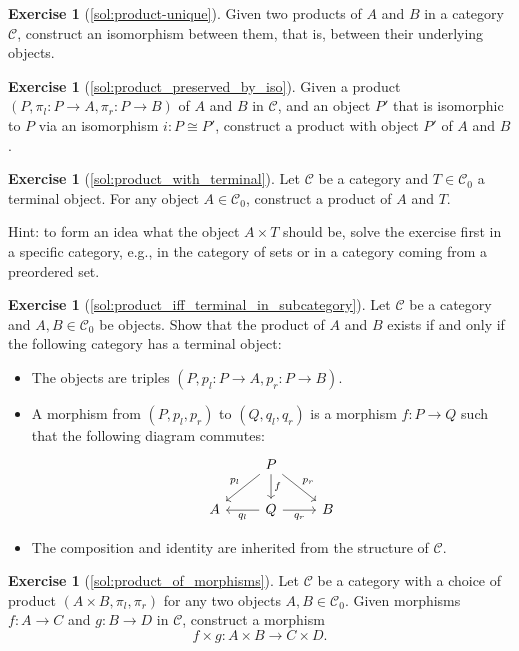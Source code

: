 \documentclass[a4paper,11pt, oneside,titlepage=false]{scrbook}
\theoremstyle{plain}
\theoremstyle{definition}
\newtheorem{exer}[thm]{Exercise}
\newcommand{\Cat}[1]{\mathcal{#1}}
\newcommand{\CC}{\Cat{C}}
\newcommand{\Ob}[1]{{#1}_0}
\newcommand{\projl}{\ensuremath{\pi_l}}
\newcommand{\projr}{\ensuremath{\pi_r}}
\begin{document}
\begin{exer}[\cref{sol:product-unique}]\label{exer:product-unique}
  Given two products of $A$ and $B$ in a category $\CC$, construct an isomorphism between them, that is, between their underlying objects.
\end{exer}

\begin{exer}[\cref{sol:product_preserved_by_iso}]\label{exer:product_preserved_by_iso}
  Given a product $(P,\projl : P \to A ,\projr : P \to B)$ of $A$ and $B$ in $\CC$, and an object $P'$ that is isomorphic to $P$ via an isomorphism $i : P \cong P'$, construct a product with object $P'$ of $A$ and $B$.
\end{exer}

\begin{exer}[\cref{sol:product_with_terminal}]\label{exer:product_with_terminal} Let $\CC$ be a category and $T\in\Ob{\CC}$ a terminal object.
  For any object $A\in \Ob{\CC}$, construct a product of $A$ and $T$.

  Hint: to form an idea what the object $A \times T$ should be, solve the exercise first in a specific category, e.g., in the category of sets or in a category coming from a preordered set.
\end{exer}




\begin{exer}[\cref{sol:product_iff_terminal_in_subcategory}]\label{exer:product_iff_terminal_in_subcategory} Let $\CC$ be a category and $A,B\in\Ob{\CC}$ be objects. Show that the product of $A$ and $B$ exists if and only if the following category has a terminal object:
\begin{itemize}
\item The objects are triples $(P,p_l: P\to A, p_r:P\to B)$.
\item A morphism from $(P,p_l,p_r)$ to $(Q,q_l,q_r)$ is a morphism $f : P \to Q$ such that the following diagram commutes:
\[
\begin{tikzcd}
& P \arrow[ld,swap, "p_l"] \arrow[rd, "p_r"] \arrow[d, "f"] & \\
A & Q \arrow[l, "q_l"]  \arrow[r,swap, "q_r"] & B
\end{tikzcd}
\]
\item The composition and identity are inherited from the structure of $\CC$.
\end{itemize}
\end{exer}

\begin{exer}[\cref{sol:product_of_morphisms}]\label{exer:product_of_morphisms}
  Let $\CC$ be a category with a choice of product $(A\times B, \projl, \projr)$ for any two objects $A,B\in \Ob{\CC}$.
  Given morphisms $f : A \to C$ and $g : B \to D$ in $\CC$, construct a morphism
  \[ f \times g : A \times B \to C \times D.\]
\end{exer}
\end{document}
